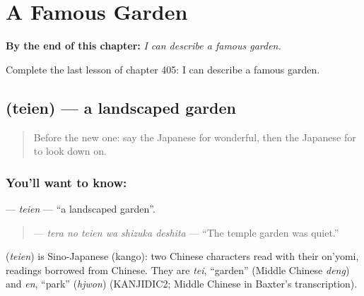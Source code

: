 
\chapter{A Famous Garden}
\label{ch:ja-a-famous-garden}

\begin{chapteropening}
\textbf{By the end of this chapter:} \emph{I can describe a famous garden.}

Complete the last lesson of chapter 405: I can describe a famous garden.
\end{chapteropening}

\section[\texorpdfstring{\ja{ていえん} (teien)}{ていえん (teien)}]{ (teien) — a landscaped garden}

\label{lesson:JA-C405-teien}



\begin{quote}
Before the new one: say the Japanese for wonderful, then the Japanese for to look down on.
\end{quote}

\subsection*{You'll want to know: }
\textbf{} — \emph{teien} — \textquotedblleft{}a landscaped garden\textquotedblright{}.

\begin{quote}
\textbf{  } — \emph{tera no teien wa shizuka deshita} — \textquotedblleft{}The temple garden was quiet.\textquotedblright{}
\end{quote}

\begin{cousinweb}
\textbf{} (\emph{teien}) is Sino-Japanese (kango): two Chinese characters read with their on'yomi, readings borrowed from Chinese. They are \emph{tei}, \textquotedblleft{}garden\textquotedblright{} (Middle Chinese \emph{deng}) and \emph{en}, \textquotedblleft{}park\textquotedblright{} (\emph{hjwon}) (KANJIDIC2; Middle Chinese in Baxter's transcription).
\end{cousinweb}

